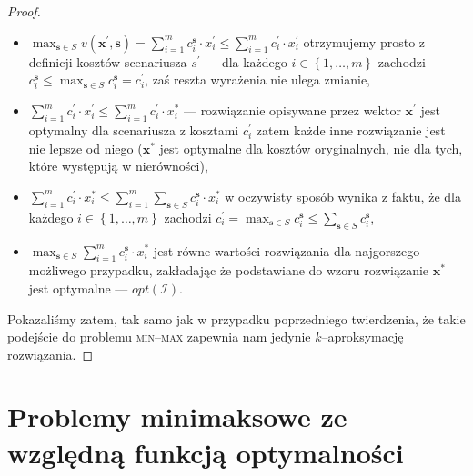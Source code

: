 \begin{proof}
	\begin{itemize}
		\item $\max_{\textbf{s} \in S} v \left( \textbf{x}^{\prime}, \textbf{s} \right) = \sum_{i = 1}^{m} c_{i}^{\textbf{s}} \cdot x_{i}^{\prime} \leqslant \sum_{i = 1}^{m} c_{i}^{\prime} \cdot x_{i}^{\prime}$ otrzymujemy prosto z definicji kosztów scenariusza $s^{\prime}$ --- dla każdego $i \in \left\{ 1, \dots, m \right\}$ zachodzi $c_{i}^{\textbf{s}} \leqslant \max_{\textbf{s} \in S} c^{\textbf{s}}_{i} = c_{i}^{\prime}$, zaś reszta wyrażenia nie ulega zmianie,
		\item $\sum_{i = 1}^{m} c_{i}^{\prime} \cdot x_{i}^{\prime} \leqslant \sum_{i = 1}^{m} c_{i}^{\prime} \cdot x_{i}^{\ast}$ --- rozwiązanie opisywane przez wektor $\textbf{x}^{\prime}$ jest optymalny dla scenariusza z kosztami $c_{i}^{\prime}$ zatem każde inne rozwiązanie jest nie lepsze od niego ($\textbf{x}^{\ast}$ jest optymalne dla kosztów oryginalnych, nie dla tych, które występują w nierówności),
		\item $\sum_{i = 1}^{m} c_{i}^{\prime} \cdot x_{i}^{\ast} \leqslant \sum_{i = 1}^{m} \sum_{\textbf{s} \in S} c_{i}^{\textbf{s}} \cdot x_{i}^{\ast}$ w oczywisty sposób wynika z faktu, że dla każdego $i \in \left\{ 1, \dots, m \right\}$ zachodzi $c_{i}^{\prime} = \max_{\textbf{s} \in S} c^{\textbf{s}}_{i} \leqslant \sum_{\textbf{s} \in S} c^{\textbf{s}}_{i}$,
		\item $\max_{\textbf{s} \in S} \sum_{i = 1}^{m} c_{i}^{\textbf{s}} \cdot x_{i}^{\ast}$ jest równe wartości rozwiązania dla najgorszego możliwego przypadku, zakładając że podstawiane do wzoru rozwiązanie $\textbf{x}^{\ast}$ jest optymalne --- $ opt \left( \mathcal{I} \right)$.
	\end{itemize}
	
	Pokazaliśmy zatem, tak samo jak w przypadku poprzedniego twierdzenia, że takie podejście do problemu \textsc{min--max} zapewnia nam jedynie $k$--aproksymację rozwiązania.
\end{proof}

\section{Problemy minimaksowe ze względną funkcją optymalności}

